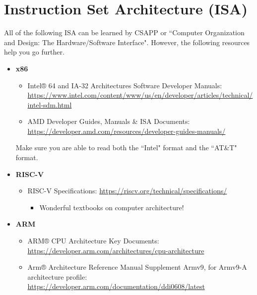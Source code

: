 \documentclass{article}
\begin{document}
\section{Instruction Set Architecture (ISA)}
All of the following ISA can be learned by CSAPP or ``Computer Organization and Design: The Hardware/Software Interface".
However, the following resources help you go further.
\begin{itemize}
    \item \textbf{x86}
    \begin{itemize}
        \item Intel® 64 and IA-32 Architectures Software Developer Manuals:\\
        \href{https://www.intel.com/content/www/us/en/developer/articles/technical/intel-sdm.html}{https://www.intel.com/content/www/us/en/developer/articles/technical/intel-sdm.html}
        \item AMD Developer Guides, Manuals \& ISA Documents:\\
        \href{https://developer.amd.com/resources/developer-guides-manuals/}{https://developer.amd.com/resources/developer-guides-manuals/}
    \end{itemize}
    Make sure you are able to read both the ``Intel" format and the ``AT\&T" format.
    \item \textbf{RISC-V}
    \begin{itemize}
        \item RISC-V Specifications:
        \href{https://riscv.org/technical/specifications/}{https://riscv.org/technical/specifications/}
        \begin{itemize}
            \item Wonderful textbooks on computer architecture!
        \end{itemize}
    \end{itemize}
    \item \textbf{ARM}
    \begin{itemize}
        \item ARM® CPU Architecture Key Documents:\\
        \href{https://developer.arm.com/architectures/cpu-architecture}{https://developer.arm.com/architectures/cpu-architecture}
        \item Arm® Architecture Reference Manual Supplement Armv9, for Armv9-A architecture profile:
        \href{https://developer.arm.com/documentation/ddi0608/latest}{https://developer.arm.com/documentation/ddi0608/latest}
    \end{itemize}

\end{itemize}
\end{document}
